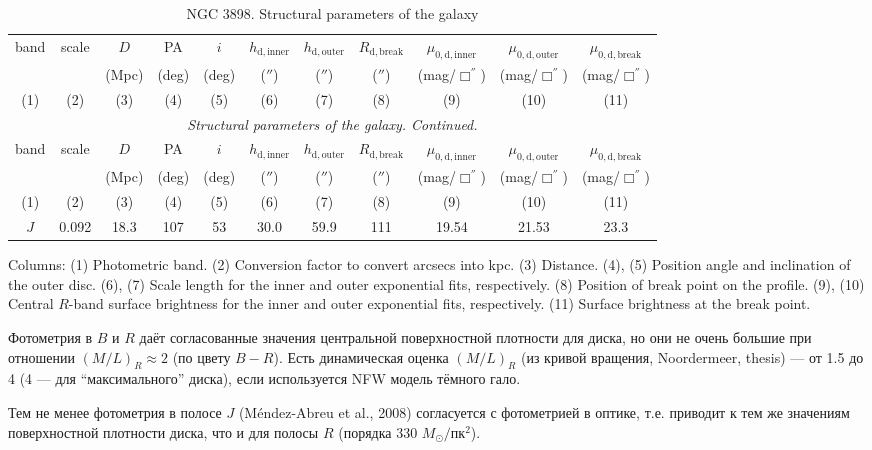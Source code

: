 \documentclass[english,10pt]{article}
\def\mm{\mathrm}
\begin{document}
\begin{longtable}[c]{ccccccccccc}
\caption{NGC 3898. Structural parameters of the galaxy} \\ 
\hline 
band & scale & $D$   & PA    & $i$ &
$h_\mm{d,inner}$ & $h_\mm{d,outer}$ & $R_\mm{d,break}$ &
$\mu_\mm{0,d,inner}$ & $\mu_\mm{0,d,outer}$ & $\mu_\mm{0,d,break}$ \\ 
     &       & (Mpc) & (deg) & (deg) &
($''$)           & ($''$)           & ($''$)           & 
(mag/$\Box^{''}$)    & (mag/$\Box^{''}$)    & (mag/$\Box^{''}$) \\
(1)&(2)&(3)&(4)&(5)&(6)&(7)&(8)&(9)&(10)&(11) \\ 
\hline
\endfirsthead 
\hline
\multicolumn{11}{c}{\small\slshape Structural parameters of the galaxy. 
Continued. } \\ \hline
band & scale & $D$   & PA    & $i$ &
$h_\mm{d,inner}$ & $h_\mm{d,outer}$ & $R_\mm{d,break}$ &
$\mu_\mm{0,d,inner}$ & $\mu_\mm{0,d,outer}$ & $\mu_\mm{0,d,break}$ \\ 
     &       & (Mpc) & (deg) & (deg) &
($''$)           & ($''$)           & ($''$)           & 
(mag/$\Box^{''}$)    & (mag/$\Box^{''}$)    & (mag/$\Box^{''}$) \\
(1)&(2)&(3)&(4)&(5)&(6)&(7)&(8)&(9)&(10)&(11) \\
\hline
\endhead 
\hline
$J$ & 0.092 & 18.3 & 107 & 53 & 
30.0 & 59.9 & 111 & 
19.54 & 21.53 & 23.3 \tabularnewline
\hline
\end{longtable}

Columns: 
(1) Photometric band. 
(2) Conversion factor to convert arcsecs into kpc.
(3) Distance.
(4), (5) Position angle and inclination of the outer disc.
(6), (7) Scale length for the inner and outer exponential fits, 
respectively. 
(8) Position of break point on the profile. 
(9), (10) Central $R$-band surface brightness 
for the inner and outer exponential fits, respectively. 
(11) Surface brightness at the break point.

\bigskip
\noindent
Фотометрия в $B$ и $R$ даёт согласованные значения центральной 
поверхностной плотности для диска, но они не очень большие 
при отношении $(M/L)_R \approx 2$ (по цвету $B-R$). Есть динамическая 
оценка $(M/L)_R$ (из кривой вращения, Noordermeer, thesis) --- 
от 1.5 до 4 (4 --- для ``максимального'' диска), если используется 
NFW модель тёмного гало.

\bigskip
\noindent
Тем не менее фотометрия в полосе $J$ (M\'{e}ndez-Abreu et al., 2008) 
согласуется с фотометрией в оптике, т.е. приводит к тем же значениям 
поверхностной плотности диска, что и для полосы $R$ 
(порядка 330 $M_\odot/$пк$^2$).
\end{document}
